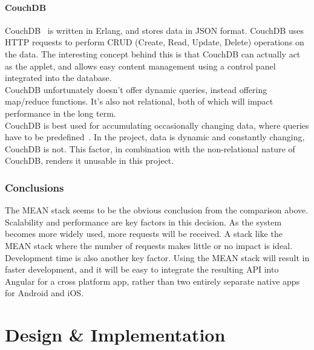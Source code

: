 \documentclass[preprint,12pt,3p]{elsarticle}
\begin{document}
\paragraph{CouchDB}
CouchDB~\cite{couchdb} is written in Erlang, and stores data in JSON format. CouchDB uses HTTP requests to perform CRUD (Create, Read, Update, Delete) operations on the data. 
The interesting concept behind this is that CouchDB can actually act as the applet, and allows easy content management using a control panel integrated into the database.\\
CouchDB unfortunately doesn't offer dynamic queries, instead offering map/reduce functions. It's also not relational, both of which will impact performance in the long term.\\
CouchDB is best used for accumulating occasionally changing data, where queries have to be predefined~\cite{databasecomparison}. In the project, data is dynamic and constantly changing, CouchDB is not. This factor, in combination with the non-relational nature of CouchDB, renders it unusable in this project.

\subsubsection{Conclusions}
The MEAN stack seems to be the obvious conclusion from the comparison above. Scalability and performance are key factors in this decision. As the system becomes more widely used, more requests will be received. A stack like the MEAN stack where the number of requests makes little or no impact is ideal.\\
Development time is also another key factor. Using the MEAN stack will result in faster development, and it will be easy to integrate the resulting API into Angular for a cross platform app, rather than two entirely separate native apps for Android and iOS.





\section{Design \& Implementation}
\end{document}

